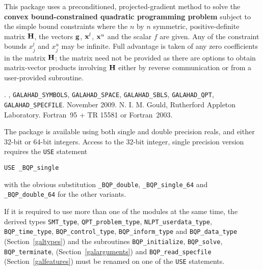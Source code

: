 \documentclass{galahad}
\newcommand{\packagename}{BQP}
\newcommand{\fullpackagename}{\libraryname\_\packagename}
\begin{document}
\galheader


\galsummary
This package uses a preconditioned, projected-gradient method
to solve the {\bf convex bound-constrained quadratic programming problem}
subject to the simple bound constraints
where the $n$ by $n$ symmetric, positive-definite matrix ${\mathbf{H}}$, the 
vectors ${\mathbf{g}}$, ${\mathbf{x}}^{l}$, ${\mathbf{x}}^{u}$ and the scalar $f$ are given.
Any of the constraint bounds $x_{j}^{l}$ and $x_{j}^{u}$ may be infinite.
Full advantage is taken of any zero coefficients in the matrix ${\mathbf{H}}$;
the matrix need not be provided as there are options to obtain matrix-vector
products involving ${\mathbf{H}}$ either by reverse communication or from a 
user-provided subroutine.


\galattributes
\galversions{\tt  \fullpackagename\_single, \fullpackagename\_double}.
,
{\tt GALAHAD\_SY\-M\-BOLS}, 
{\tt GALAHAD\-\_\-SPACE}, 
{\tt GALAHAD\_SBLS},
{\tt GALAHAD\_QPT},
{\tt GALAHAD\_SPECFILE}.
\galdate November 2009.
\galorigin N. I. M. Gould, Rutherford Appleton Laboratory.
\gallanguage Fortran~95 + TR 15581 or Fortran~2003. 


\galhowto


The package is available using both single and double precision reals, 
and either 32-bit or 64-bit integers. Access to the 32-bit integer,
single precision version requires the {\tt USE} statement
\medskip

\hspace{8mm} {\tt USE \fullpackagename\_single}

\medskip
\noindent
with the obvious substitution {\tt \fullpackagename\_double},
{\tt \fullpackagename\_single\_64} and 
{\tt \fullpackagename\_double\_64} for the other variants.

\noindent
If it is required to use more than one of the modules at the same time, 
the derived types
{\tt SMT\_type}, 
{\tt QPT\_problem\_type}, 
{\tt NLPT\_userdata\-\_type},
{\tt \packagename\_time\_type}, 
{\tt \packagename\_control\_type}, 
{\tt \packagename\_inform\_type} 
and
{\tt \packagename\_data\_type}
(Section~\ref{galtypes})
and the subroutines
{\tt \packagename\_initialize}, 
{\tt \packagename\_\-solve},
{\tt \packagename\_terminate},
(Section~\ref{galarguments})
and 
{\tt \packagename\_read\_specfile}
(Section~\ref{galfeatures})
must be renamed on one of the {\tt USE} statements.
\end{document}
